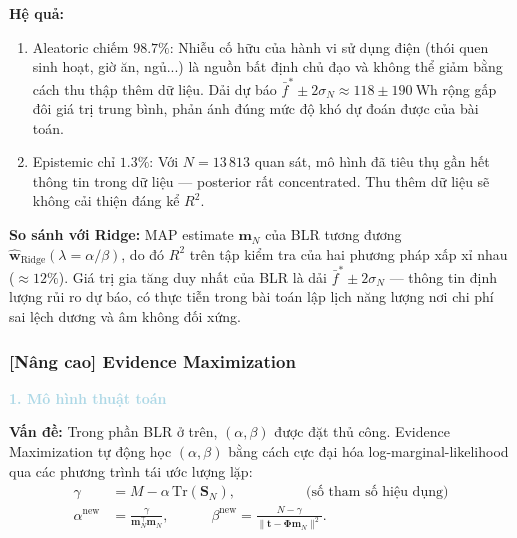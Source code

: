 \textbf{Hệ quả:}
\begin{enumerate}[labelsep=10pt, leftmargin=2cm]
  \item Aleatoric chiếm $98.7\%$: Nhiễu cố hữu của hành vi sử dụng điện
        (thói quen sinh hoạt, giờ ăn, ngủ...) là nguồn bất định chủ đạo và
        không thể giảm bằng cách thu thập thêm dữ liệu. Dải dự báo
        $\bar{f}^* \pm 2\sigma_N \approx 118 \pm 190\ \text{Wh}$ rộng gấp đôi
        giá trị trung bình, phản ánh đúng mức độ khó dự đoán được của bài toán.

  \item Epistemic chỉ $1.3\%$: Với $N = 13\,813$ quan sát, mô hình đã
        tiêu thụ gần hết thông tin trong dữ liệu --- posterior rất concentrated.
        Thu thêm dữ liệu sẽ không cải thiện đáng kể $R^2$.
\end{enumerate}

\textbf{So sánh với Ridge:} MAP estimate $\mathbf{m}_N$ của BLR tương đương
$\hat{\boldsymbol{w}}_{\mathrm{Ridge}}(\lambda = \alpha/\beta)$, do đó $R^2$
trên tập kiểm tra của hai phương pháp xấp xỉ nhau ($\approx 12\%$).
Giá trị gia tăng duy nhất của BLR là dải $\bar{f}^* \pm 2\sigma_N$ ---
thông tin định lượng rủi ro dự báo, có thực tiễn trong bài toán lập lịch
năng lượng nơi chi phí sai lệch dương và âm không đối xứng.

\subsubsection{[Nâng cao] Evidence Maximization}

\noindent\textcolor{lightblue}{\textbf{1. Mô hình thuật toán}}

\textbf{Vấn đề:} Trong phần BLR ở trên, $(\alpha, \beta)$ được đặt thủ công.
Evidence Maximization tự động học
$(\alpha, \beta)$ bằng cách cực đại hóa log-marginal-likelihood qua các
phương trình tái ước lượng lặp:
\begin{align*}
  \gamma &= M - \alpha\,\mathrm{Tr}(\mathbf{S}_N), \qquad\qquad\quad
             \text{(số tham số hiệu dụng)} \\
  \alpha^{\mathrm{new}} &= \frac{\gamma}{\mathbf{m}_N^\top\mathbf{m}_N}, \qquad\quad
  \beta^{\mathrm{new}}  = \frac{N - \gamma}{\|\boldsymbol{t} - \boldsymbol{\Phi}\mathbf{m}_N\|^2}.
\end{align*}


